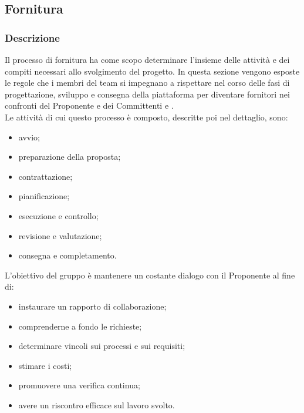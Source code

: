 \subsection{Fornitura}
    \subsubsection{Descrizione}
     Il processo di fornitura ha come scopo determinare l'insieme delle attività e dei compiti necessari allo svolgimento del progetto. 
     In questa sezione vengono esposte le regole che i membri del team \Gruppo{} si impegnano a rispettare nel corso delle fasi di progettazione, sviluppo e consegna della piattaforma \NomeProgetto{} per diventare fornitori nei confronti del Proponente \Proponente{} e dei Committenti \TV{} e \RC{}. \\
     Le attività di cui questo processo è composto, descritte poi nel dettaglio, sono:
     \begin{itemize}
        	\item{avvio;}
        	\item{preparazione della proposta;}
        	\item{contrattazione;}
        	\item{pianificazione;}
        	\item{esecuzione e controllo;}
        	\item{revisione e valutazione;}
        	\item{consegna e completamento.}
     \end{itemize}
     L'obiettivo del gruppo è mantenere un costante dialogo con il Proponente al fine di:
     \begin{itemize}
	\item{instaurare un rapporto di collaborazione;}
	\item{comprenderne a fondo le richieste;}
	\item{determinare vincoli sui processi e sui requisiti;}
	\item{stimare i costi;}
	\item{promuovere una verifica continua;}
	\item{avere un riscontro efficace sul lavoro svolto.}
     \end{itemize}

